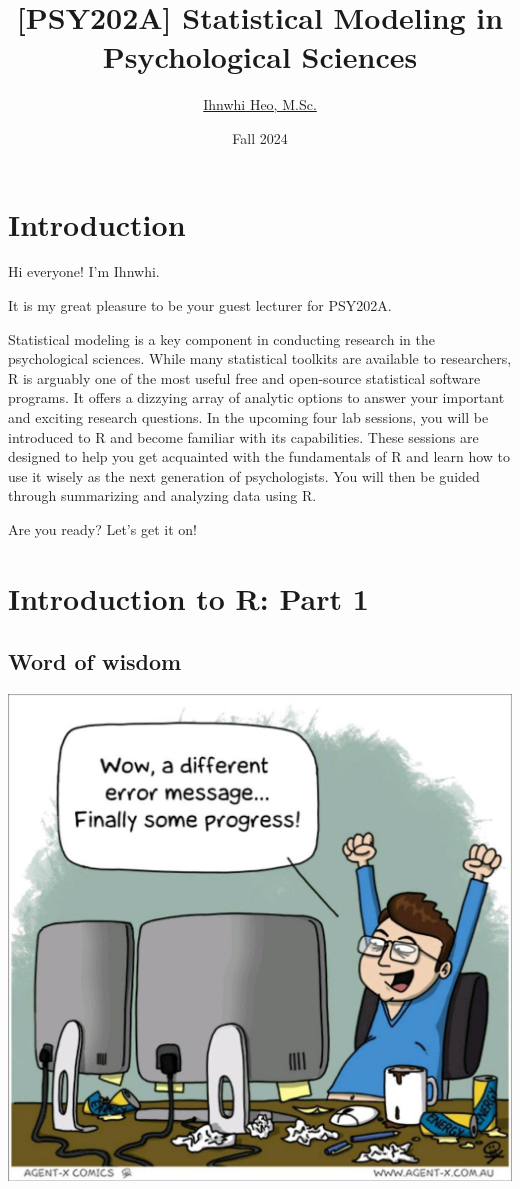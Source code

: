\documentclass[
]{book}
\title{{[}PSY202A{]} Statistical Modeling in Psychological Sciences}
\author{\href{https://ihnwhiheo.github.io/}{Ihnwhi Heo, M.Sc.}}
\date{Fall 2024}
\begin{document}
\maketitle

{
\setcounter{tocdepth}{1}
\tableofcontents
}
\chapter{Introduction}\label{introduction}

Hi everyone! I'm Ihnwhi.

It is my great pleasure to be your guest lecturer for PSY202A.

Statistical modeling is a key component in conducting research in the psychological sciences. While many statistical toolkits are available to researchers, R is arguably one of the most useful free and open-source statistical software programs. It offers a dizzying array of analytic options to answer your important and exciting research questions. In the upcoming four lab sessions, you will be introduced to R and become familiar with its capabilities. These sessions are designed to help you get acquainted with the fundamentals of R and learn how to use it wisely as the next generation of psychologists. You will then be guided through summarizing and analyzing data using R.

Are you ready? Let's get it on!

\chapter{Introduction to R: Part 1}\label{introduction-to-r-part-1}

\section{Word of wisdom}\label{word-of-wisdom}

\includegraphics{./img/programming_meme.jpg}
\end{document}
